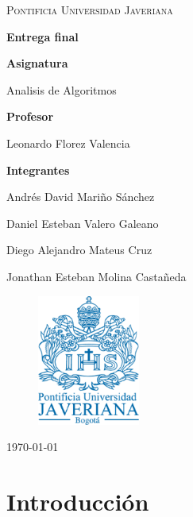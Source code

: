 \documentclass[12pt]{article}
\begin{document}
\begin{titlepage}
	\centering

	{\scshape\Large Pontificia Universidad Javeriana \par}
	\vspace{1cm}
	{\huge\bfseries Entrega final\par}
	\vspace{1.2cm}
		{\Large\textbf{Asignatura}\par}
	\vspace{0.3cm}
	{\large Analisis de Algoritmos \par}
	\vspace{0.6cm}
	{\Large\textbf{Profesor}\par}
	\vspace{0.3cm}
	{\large Leonardo Florez Valencia \par}
	\vspace{0.6cm}
	\vspace{0.6cm}
	{\Large\textbf{Integrantes}\par}
	\vspace{0.3cm}
	{\large Andrés David Mariño Sánchez\par}
	{\large Daniel Esteban Valero Galeano\par}
	{\large Diego Alejandro Mateus Cruz\par}
	{\large Jonathan Esteban Molina Castañeda\par}
	\vspace{0.3cm}
	\begin{figure}[!ht] 
  \centering
    \includegraphics[width=0.3\textwidth]{logo.png}
  \label{fig:logoGrupo}
\end{figure}
\vspace{0.6cm}
	{\large \today\par}

\end{titlepage}

\section{Introducción}
\end{document}
